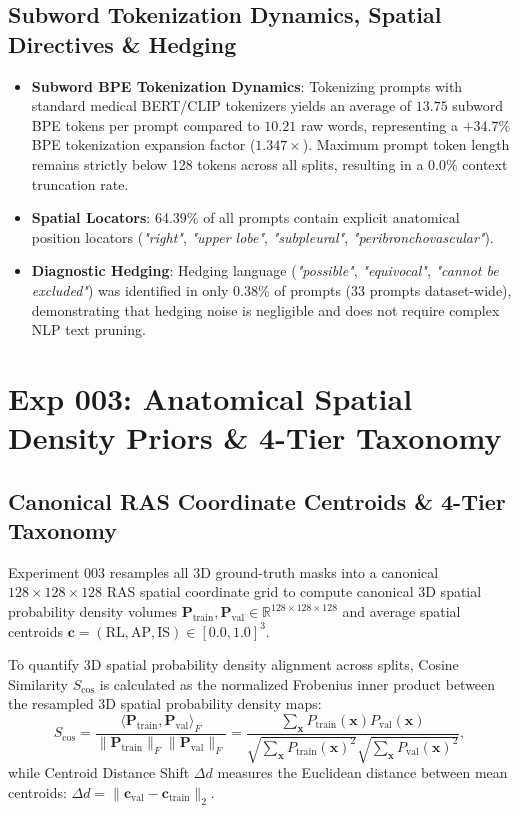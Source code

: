 \documentclass[11pt,a4paper]{article}
\begin{document}
\subsection{Subword Tokenization Dynamics, Spatial Directives \& Hedging}
\begin{itemize}
    \item \textbf{Subword BPE Tokenization Dynamics}: Tokenizing prompts with standard medical BERT/CLIP tokenizers yields an average of $13.75$ subword BPE tokens per prompt compared to $10.21$ raw words, representing a $+34.7\%$ BPE tokenization expansion factor ($1.347\times$). Maximum prompt token length remains strictly below 128 tokens across all splits, resulting in a $0.0\%$ context truncation rate.
    \item \textbf{Spatial Locators}: 64.39\% of all prompts contain explicit anatomical position locators (\textit{"right"}, \textit{"upper lobe"}, \textit{"subpleural"}, \textit{"peribronchovascular"}).
    \item \textbf{Diagnostic Hedging}: Hedging language (\textit{"possible"}, \textit{"equivocal"}, \textit{"cannot be excluded"}) was identified in only 0.38\% of prompts (33 prompts dataset-wide), demonstrating that hedging noise is negligible and does not require complex NLP text pruning.
\end{itemize}

\section{Exp 003: Anatomical Spatial Density Priors \& 4-Tier Taxonomy}

\subsection{Canonical RAS Coordinate Centroids \& 4-Tier Taxonomy}
Experiment 003 resamples all 3D ground-truth masks into a canonical $128 \times 128 \times 128$ RAS spatial coordinate grid to compute canonical 3D spatial probability density volumes $\mathbf{P}_{\text{train}}, \mathbf{P}_{\text{val}} \in \mathbb{R}^{128 \times 128 \times 128}$ and average spatial centroids $\mathbf{c} = (\text{RL}, \text{AP}, \text{IS}) \in [0.0, 1.0]^3$. 

To quantify 3D spatial probability density alignment across splits, Cosine Similarity $S_{\text{cos}}$ is calculated as the normalized Frobenius inner product between the resampled 3D spatial probability density maps:
\begin{equation}
S_{\text{cos}} = \frac{\langle \mathbf{P}_{\text{train}}, \mathbf{P}_{\text{val}} \rangle_F}{\|\mathbf{P}_{\text{train}}\|_F \|\mathbf{P}_{\text{val}}\|_F} = \frac{\sum_{\mathbf{x}} P_{\text{train}}(\mathbf{x}) P_{\text{val}}(\mathbf{x})}{\sqrt{\sum_{\mathbf{x}} P_{\text{train}}(\mathbf{x})^2} \sqrt{\sum_{\mathbf{x}} P_{\text{val}}(\mathbf{x})^2}},
\end{equation}
while Centroid Distance Shift $\Delta d$ measures the Euclidean distance between mean centroids: $\Delta d = \|\mathbf{c}_{\text{val}} - \mathbf{c}_{\text{train}}\|_2$.
\end{document}
